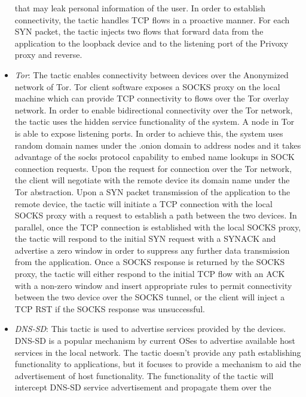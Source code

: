 \begin{itemize}
    that may leak personal information of the user. In order to establish
    connectivity, the tactic handles TCP flows in a proactive manner. For each
    SYN packet, the tactic injects two flows that forward data from the
    application to the loopback device and to the listening port of the Privoxy proxy and
    reverse.
  \item \emph{Tor}: The tactic enables connectivity between devices over the
        Anonymized network of Tor. Tor client software exposes a SOCKS proxy on
        the local machine which can provide TCP connectivity to flows over the
        Tor overlay network. In order to enable bidirectional connectivity over
        the Tor network, the tactic uses the hidden service functionality of the
        system. A node in Tor is able to expose listening ports. In order to
        achieve this, the system uses random domain names under the .onion
        domain to address nodes and it takes advantage of the socks protocol
        capability to embed name lookups in SOCK connection requests. 
        Upon the request for connection over the Tor network, the \signpost
        client will negotiate with the remote device its domain name under the
        Tor abstraction. Upon a SYN packet transmission of the application to
        the remote device, the tactic will initiate a TCP connection with the
        local SOCKS proxy with a
        request to establish a path between the two devices. In parallel,
        once the TCP connection is established with the local SOCKS proxy, the
        tactic will respond to the initial SYN request with a SYNACK and advertise a zero
        window in order to suppress any further data transmission from the application.
        Once a SOCKS response is returned by the SOCKS proxy, the tactic will
        either respond to the initial TCP flow with an ACK with a non-zero
        window and insert appropriate \of rules to permit connectivity between
        the two device over the SOCKS tunnel, or the client will inject a TCP RST 
        if the SOCKS response was unsuccessful. 
  \item \emph{DNS-SD}: This tactic is used to advertise services provided by the
        \signpost devices. DNS-SD is a popular mechanism by current OSes to
        advertise available host services in the local network.
        The tactic doesn't provide any path establishing functionality to
        applications, but it focuses to provide a mechanism to aid the
        advertisement of host functionality. The functionality of the tactic will
        intercept DNS-SD service advertisement and propagate them over the

\end{itemize}
